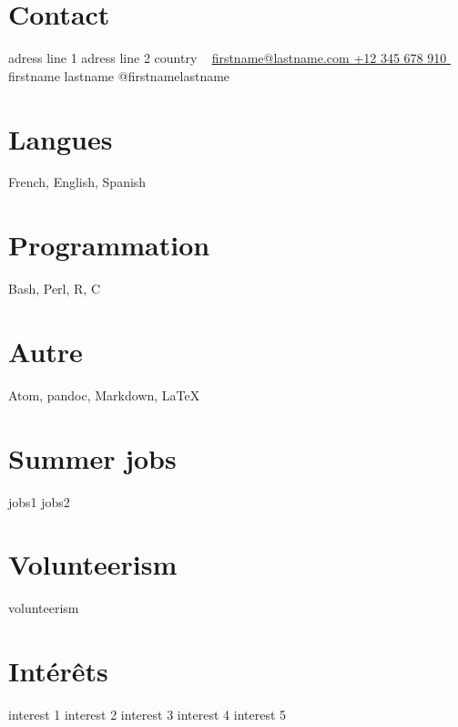 \documentclass[]{friggeri-cv}
\begin{document}
	\setlength{\textheight}{700pt}



	\begin{aside}
		\setlength{\fboxsep}{0pt}  %
		\setlength{\fboxrule}{2pt} %
		\section{Contact \faHome}
			adress line 1
			adress line 2
			country
			~
			\href{mailto:firstname@lastname.com}{firstname@lastname.com \faInbox}
			\href{tel:+12345678910}{+12 345 678 910 \faPhone}
			~
			firstname lastname \faLinkedin
			@firstnamelastname \faTwitter
		\section{Langues \faGlobe}
			French, English, Spanish
		\section{Programmation \faLaptop}
			Bash, Perl, R, C
		\section{Autre \faTerminal}
			Atom, pandoc, Markdown, \LaTeX
		\section{Summer jobs \faIndustry}
			jobs1
			jobs2
		\section{Volunteerism \faUsers}
			volunteerism
		\section{Intérêts \faHeart}
			interest 1
			interest 2
			interest 3
			interest 4
			interest 5
	\end{aside}
\end{document}
